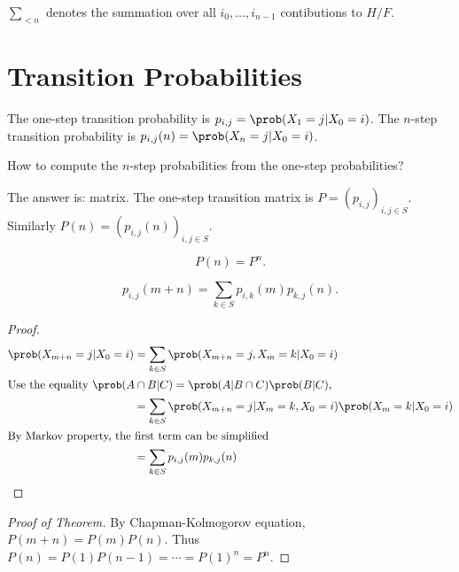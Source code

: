 \documentclass[a4paper]{article}
\begin{document}
\begin{notation}
  $\sum_{<n}$ denotes the summation over all $i_0,\ldots, i_{n-1}$ contibutions to $H/F$.
\end{notation}

\section{Transition Probabilities}

The one-step transition probability is $p_{i,j} = \prob(X_1=j|X_0=i)$. The $n$-step transition probability is $p_{i,j}(n) = \prob(X_n=j|X_0=i)$.

\begin{question}
  How to compute the $n$-step probabilities from the one-step probabilities?
\end{question}

The answer is: matrix. The one-step transition matrix is $P=(p_{i,j})_{i,j\in S}$. Similarly $P(n) = (p_{i,j}(n))_{i,j\in S}$.

\begin{theorem}
  \[
    P(n) = P^n.
  \]
\end{theorem}

\begin{proposition}
  \[
    p_{i,j}(m+n) = \sum_{k\in S} p_{i,k}(m) p_{k,j}(n).
  \]
 
\end{proposition}

\begin{proof}
  \begin{align*}
    \prob(X_{m+n}=j|X_0=i) &= \sum_{k\in S} \prob(X_{m+n}=j,X_m=k|X_0=i) \\
    \intertext{Use the equality $\prob(A\cap B|C) = \prob(A|B\cap C)\prob(B|C)$,}
                        &= \sum_{k\in S} \prob(X_{m+n}=j| X_m=k,X_0=i)\prob(X_m=k|X_0=i) \\
    \intertext{By Markov property, the first term can be simplified}
                        &= \sum_{k\in S} p_{i,j}(m) p_{k,j}(n)
  \end{align*}
\end{proof}

\begin{proof}[Proof of Theorem]
  By Chapman-Kolmogorov equation, $P(m+n) = P(m)P(n)$. Thus $P(n) = P(1)P(n-1)=\cdots =P(1)^n=P^n$.
\end{proof}
\end{document}
